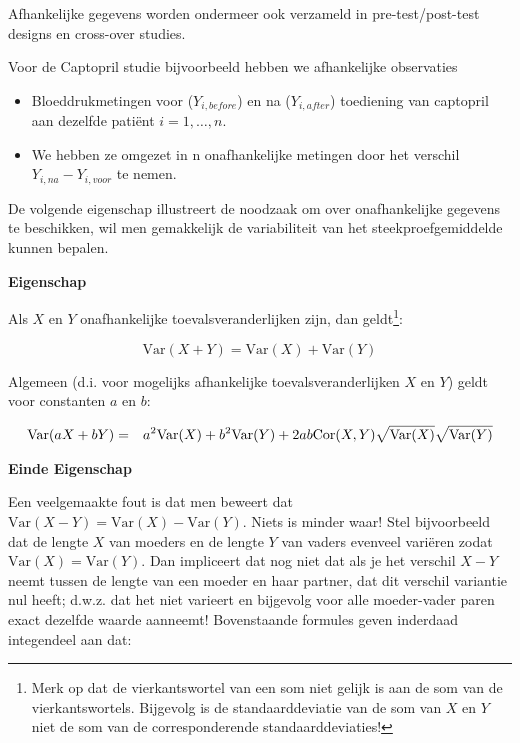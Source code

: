 \documentclass[
  12pt,dutch,coursenotes]{book}
\providecommand{\tightlist}{%
  \setlength{\itemsep}{0pt}\setlength{\parskip}{0pt}}
\begin{document}
Afhankelijke gegevens worden ondermeer ook verzameld in
pre-test/post-test designs en cross-over studies.

Voor de Captopril studie bijvoorbeeld hebben we afhankelijke observaties

\begin{itemize}
\tightlist
\item
  Bloeddrukmetingen voor (\(Y_{i,before}\)) en na (\(Y_{i,after}\)) toediening van captopril aan dezelfde patiënt \(i=1,\ldots,n\).
\item
  We hebben ze omgezet in n onafhankelijke metingen door het verschil \(Y_{i,na}-Y_{i,voor}\) te nemen.
\end{itemize}

De volgende eigenschap illustreert de noodzaak om over onafhankelijke gegevens te beschikken,
wil men gemakkelijk de variabiliteit van het steekproefgemiddelde kunnen bepalen.

\textbf{Eigenschap}

Als \(X\) en \(Y\) onafhankelijke toevalsveranderlijken zijn,
dan geldt\footnote{Merk op dat de vierkantswortel van een som niet gelijk is aan de som van de
  vierkantswortels. Bijgevolg is de standaarddeviatie van de som van \(X\) en \(Y\)
  niet de som van de corresponderende standaarddeviaties!}:

\begin{equation*}
\text{Var}(X+Y) = \text{Var}(X) + \text{Var}(Y)
\end{equation*}

Algemeen (d.i. voor mogelijks afhankelijke toevalsveranderlijken \(X\) en \(Y\)) geldt voor constanten \(a\) en \(b\):

\begin{eqnarray*}
\text{Var}(aX+bY) &=& a^2 \text{Var}(X) + b^2 \text{Var}(Y) + 2 ab {%
\text{Cor}}(X,Y)\sqrt{\text{Var}(X)}\sqrt{\text{Var}(Y)}
\end{eqnarray*}

\textbf{Einde Eigenschap}

Een veelgemaakte fout is dat men beweert dat \(\text{Var}(X-Y)=\text{Var}(X)-\text{Var}(Y)\). Niets is minder waar! Stel bijvoorbeeld dat de lengte \(X\) van moeders en de lengte \(Y\) van vaders evenveel variëren zodat \(\text{Var}(X)=\text{Var}(Y)\). Dan impliceert dat nog niet dat als je het verschil \(X-Y\) neemt tussen de lengte van een moeder en haar partner, dat dit verschil variantie nul heeft; d.w.z. dat het niet varieert en bijgevolg voor alle
moeder-vader paren exact dezelfde waarde aanneemt! Bovenstaande formules
geven inderdaad integendeel aan dat:
\end{document}

